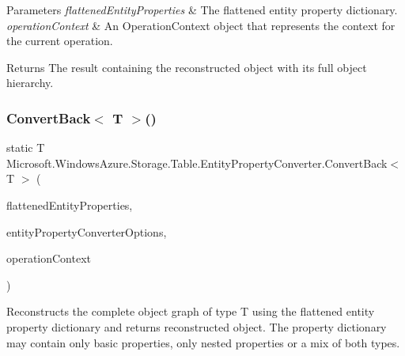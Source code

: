 \begin{DoxyParams}{Parameters}
{\em flattened\+Entity\+Properties} & The flattened entity property dictionary.\\
\hline
{\em operation\+Context} & An Operation\+Context object that represents the context for the current operation.\\
\hline
\end{DoxyParams}
\begin{DoxyReturn}{Returns}
The result containing the reconstructed object with its full object hierarchy.
\end{DoxyReturn}
\mbox{\label{classMicrosoft_1_1WindowsAzure_1_1Storage_1_1Table_1_1EntityPropertyConverter_a3beb7c8638a8f6a84bd16c0f0a00521d}} 
\subsubsection{\texorpdfstring{Convert\+Back$<$ T $>$()}{ConvertBack< T >()}\hspace{0.1cm}{\footnotesize\ttfamily [2/2]}}
{\footnotesize\ttfamily static T Microsoft.\+Windows\+Azure.\+Storage.\+Table.\+Entity\+Property\+Converter.\+Convert\+Back$<$ T $>$ (\begin{DoxyParamCaption}\item[{I\+Dictionary$<$ string, Entity\+Property $>$}]{flattened\+Entity\+Properties,  }\item[{Entity\+Property\+Converter\+Options}]{entity\+Property\+Converter\+Options,  }\item[{Operation\+Context}]{operation\+Context }\end{DoxyParamCaption})\hspace{0.3cm}{\ttfamily [static]}}



Reconstructs the complete object graph of type T using the flattened entity property dictionary and returns reconstructed object. The property dictionary may contain only basic properties, only nested properties or a mix of both types. 


